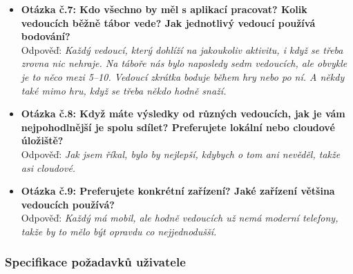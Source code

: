 \documentclass[a4paper, 12pt]{article} %
\begin{document}
\begin{itemize}
    \item \textbf{Otázka č.7: Kdo všechno by měl s aplikací pracovat? Kolik vedoucích běžně 
    tábor vede? Jak jednotlivý vedoucí používá bodování?} \\
    Odpověď: \textit{Každý vedoucí, který dohlíží na jakoukoliv aktivitu, i když se třeba 
    zrovna nic nehraje. Na táboře nás bylo naposledy sedm vedoucích, ale obvykle je to něco 
    mezi 5–10. Vedoucí zkrátka boduje během hry nebo po ní. A někdy také mimo hru, když se 
    třeba někdo hodně snaží.}

    \item \textbf{Otázka č.8: Když máte výsledky od různých vedoucích, jak je vám 
    nejpohodlnější je spolu sdílet? Preferujete lokální nebo cloudové úložiště?} \\
    Odpověď: \textit{Jak jsem říkal, bylo by nejlepší, kdybych o tom ani nevěděl, takže asi 
    cloudové.}

    \item \textbf{Otázka č.9: Preferujete konkrétní zařízení? Jaké zařízení většina vedoucích 
    používá?} \\
    Odpověď: \textit{Každý má mobil, ale hodně vedoucích už nemá moderní telefony, takže by to 
    mělo být opravdu co nejjednodušší.}
\end{itemize}

\subsubsection{Specifikace požadavků uživatele}
\end{document}
